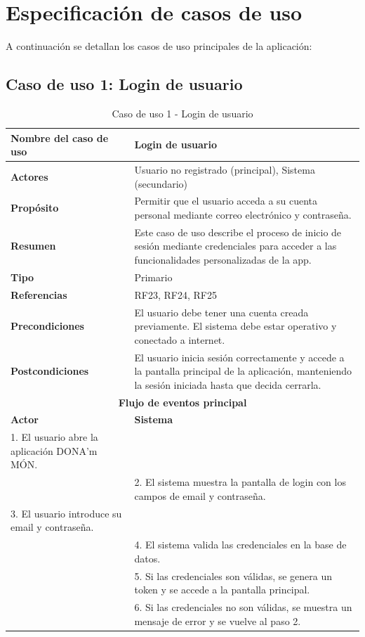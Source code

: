 \section{Especificación de casos de uso}

A continuación se detallan los casos de uso principales de la aplicación:
\subsection{Caso de uso 1: Login de usuario}
\captionsetup{skip=0pt}
\begin{table}[H]
\centering
\caption{Caso de uso 1 - Login de usuario}
\begin{tabular}{|p{4.5cm}|p{10.5cm}|}
\hline
\textbf{Nombre del caso de uso} & Login de usuario \\
\hline
\textbf{Actores} & Usuario no registrado (principal), Sistema (secundario) \\
\hline
\textbf{Propósito} & Permitir que el usuario acceda a su cuenta personal mediante correo electrónico y contraseña. \\
\hline
\textbf{Resumen} & Este caso de uso describe el proceso de inicio de sesión mediante credenciales para acceder a las funcionalidades personalizadas de la app. \\
\hline
\textbf{Tipo} & Primario \\
\hline
\textbf{Referencias} & RF23, RF24, RF25 \\
\hline
\textbf{Precondiciones} & El usuario debe tener una cuenta creada previamente. El sistema debe estar operativo y conectado a internet. \\
\hline
\textbf{Postcondiciones} & El usuario inicia sesión correctamente y accede a la pantalla principal de la aplicación, manteniendo la sesión iniciada hasta que decida cerrarla. \\
\hline
\multicolumn{2}{|c|}{\textbf{Flujo de eventos principal}} \\
\hline
\textbf{Actor} & \textbf{Sistema} \\
\hline
1. El usuario abre la aplicación DONA’m MÓN. & \\
\hline
& 2. El sistema muestra la pantalla de login con los campos de email y contraseña. \\
\hline
3. El usuario introduce su email y contraseña. & \\
\hline
& 4. El sistema valida las credenciales en la base de datos. \\
\hline
& 5. Si las credenciales son válidas, se genera un token y se accede a la pantalla principal. \\
\hline
& 6. Si las credenciales no son válidas, se muestra un mensaje de error y se vuelve al paso 2. \\
\hline
\end{tabular}
\end{table}


